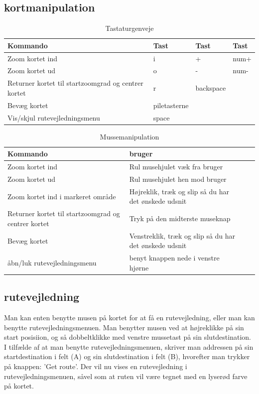 \subsection{kortmanipulation}
\begin{table}[h!t]
\centering
	\caption{Tastaturgenveje}
	\begin{tabular}{p{3cm} l l l}
		\hline\hline
		Kommando & Tast & Tast & Tast \\ [0.5ex]
		\hline
		Zoom kortet ind & i & + & num+\\
		Zoom kortet ud & o & - & num-\\
		Returner kortet til startzoomgrad og centrer kortet & r & backspace\\
		Bevæg kortet & piletasterne\\
		Vis/skjul rutevejledningsmenu & space \\
		\hline
	\end{tabular}
\end{table}

\begin{table}[h!t]
\centering
	\caption{Mussemanipulation}
	\begin{tabular}{p{3cm} l l p{5cm}}
		\hline\hline
		Kommando & bruger \\ [0.5ex]
		\hline
		Zoom kortet ind & Rul musehjulet væk fra bruger\\
		Zoom kortet ud & Rul musehjulet hen mod bruger\\
		Zoom kortet ind i markeret område & Højreklik, træk og slip så du har det ønskede udsnit\\
		Returner kortet til startzoomgrad og centrer kortet & Tryk på den midterste museknap\\
		Bevæg kortet & Venstreklik, træk og slip så du har det ønskede udsnit\\
		åbn/luk rutevejledningsmenu & benyt knappen nede i venstre hjørne\\
		\hline
	\end{tabular}
\end{table}

\subsection{rutevejledning}

Man kan enten  benytte musen på kortet for at få en rutevejledning, eller man kan benytte rutevejledningsmenuen. Man benytter musen ved at højreklikke på sin start posisiion, og så dobbeltklikke med venstre mussetast på sin slutdestination. I tilfælde af at man benytte rutevejledningsmenuen, skriver man addressen på sin startdestination i felt (A) og sin slutdestination i felt (B), hvorefter man trykker på knappen: 'Get route'. Der vil nu vises en rutevejledning i rutevejledningsmenuen, såvel som at ruten vil være tegnet med en lyserød farve på kortet.

